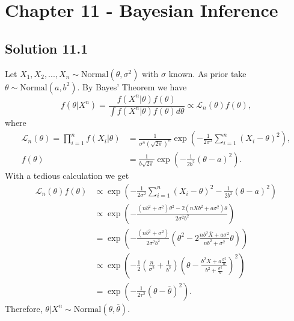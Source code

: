 \section*{Chapter 11 - Bayesian Inference}

\subsection*{Solution 11.1}

Let $X_1, X_2, ..., X_n \sim \mathrm{Normal}(\theta, \sigma^2)$ with $\sigma$ known.
As prior take $\theta \sim \mathrm{Normal}(a, b^2)$.
By Bayes' Theorem we have
\begin{equation*}
    f(\theta|X^n) = \frac{f(X^n|\theta) f(\theta)}{\int f(X^n|\theta)f(\theta) d\theta}
        \propto \mathcal{L}_n(\theta) f(\theta),
\end{equation*}
where
\begin{equation*}
    \begin{split}
        \mathcal{L}_n(\theta)
            = \prod_{i = 1}^n f(X_i|\theta)
            &= \frac{1}{\sigma^n (\sqrt{2\pi})^n} \exp\left(-\frac{1}{2\sigma^2} \sum_{i = 1}^n (X_i - \theta)^2\right), \\
        f(\theta) &= \frac{1}{b\sqrt{2\pi}} \exp\left(-\frac{1}{2b^2} (\theta - a)^2\right).
    \end{split}
\end{equation*}
With a tedious calculation we get
\begin{equation*}
    \begin{split}
        \mathcal{L}_n(\theta)f(\theta)
            &\propto \exp\left(-\frac{1}{2\sigma^2} \sum_{i = 1}^n (X_i - \theta)^2 - \frac{1}{2b^2} (\theta - a)^2\right) \\
            &\propto \exp\left(-\frac{(nb^2 + \sigma^2)\theta^2 - 2(n\overline{X}b^2 + a\sigma^2)\theta}{2\sigma^2b^2}\right) \\
            &= \exp\left(-\frac{(nb^2 + \sigma^2)}{2\sigma^2b^2}\left(\theta^2 - 2\frac{nb^2\overline{X} + a\sigma^2}{nb^2 + \sigma^2}\theta\right)\right) \\
            &\propto \exp\left(-\frac{1}{2}\left(\frac{n}{\sigma^2} + \frac{1}{b^2}\right)\left(\theta - \frac{b^2\overline{X} + a\frac{\sigma^2}{n}}{b^2 + \frac{\sigma^2}{n}}\right)^2\right) \\
            &=\exp\left(-\frac{1}{2\tau^2}(\theta - \overline{\theta})^2\right).
    \end{split}
\end{equation*}
Therefore, $\theta|X^n \sim \mathrm{Normal}(\theta, \overline{\theta})$.
